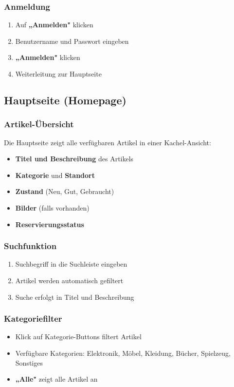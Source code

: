 \documentclass[a4paper,12pt]{article}
\begin{document}
\subsubsection{Anmeldung}
\begin{enumerate}
    \item Auf \textbf{„Anmelden"} klicken
    \item Benutzername und Passwort eingeben
    \item \textbf{„Anmelden"} klicken
    \item Weiterleitung zur Hauptseite
\end{enumerate}

\subsection{Hauptseite (Homepage)}

\subsubsection{Artikel-Übersicht}
Die Hauptseite zeigt alle verfügbaren Artikel in einer Kachel-Ansicht:
\begin{itemize}
    \item \textbf{Titel und Beschreibung} des Artikels
    \item \textbf{Kategorie} und \textbf{Standort}
    \item \textbf{Zustand} (Neu, Gut, Gebraucht)
    \item \textbf{Bilder} (falls vorhanden)
    \item \textbf{Reservierungsstatus}
\end{itemize}

\subsubsection{Suchfunktion}
\begin{enumerate}
    \item Suchbegriff in die Suchleiste eingeben
    \item Artikel werden automatisch gefiltert
    \item Suche erfolgt in Titel und Beschreibung
\end{enumerate}

\subsubsection{Kategoriefilter}
\begin{itemize}
    \item Klick auf Kategorie-Buttons filtert Artikel
    \item Verfügbare Kategorien: Elektronik, Möbel, Kleidung, Bücher, Spielzeug, Sonstiges
    \item \textbf{„Alle"} zeigt alle Artikel an
\end{itemize}
\end{document}
